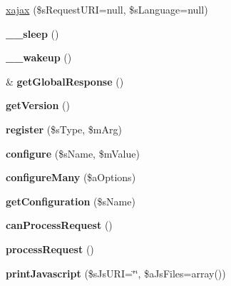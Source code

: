 \begin{DoxyCompactItemize}
\item 
\hyperlink{classxajax_adbddae8f02c1f248d6650dee56503ea3}{xajax} (\$sRequestURI=null, \$sLanguage=null)
\item 
\hypertarget{classxajax_a5f558295844bdfce0e5f1cc6aeddbf36}{
{\bfseries \_\-\_\-sleep} ()}
\label{classxajax_a5f558295844bdfce0e5f1cc6aeddbf36}

\item 
\hypertarget{classxajax_a30fd0f96255196bb018649011859f9e4}{
{\bfseries \_\-\_\-wakeup} ()}
\label{classxajax_a30fd0f96255196bb018649011859f9e4}

\item 
\hypertarget{classxajax_ab66d9aa22adc834870a7364e1b3cfabe}{
\& {\bfseries getGlobalResponse} ()}
\label{classxajax_ab66d9aa22adc834870a7364e1b3cfabe}

\item 
\hypertarget{classxajax_aa19cad4cb09886a518bae628de3ca707}{
{\bfseries getVersion} ()}
\label{classxajax_aa19cad4cb09886a518bae628de3ca707}

\item 
\hypertarget{classxajax_af63bdba3338c33a8811a74a968c788bc}{
{\bfseries register} (\$sType, \$mArg)}
\label{classxajax_af63bdba3338c33a8811a74a968c788bc}

\item 
\hypertarget{classxajax_aaac9a89700c41ca194a6036a7db20120}{
{\bfseries configure} (\$sName, \$mValue)}
\label{classxajax_aaac9a89700c41ca194a6036a7db20120}

\item 
\hypertarget{classxajax_a7cda7cef77d0048c33cdebf3b0eee539}{
{\bfseries configureMany} (\$aOptions)}
\label{classxajax_a7cda7cef77d0048c33cdebf3b0eee539}

\item 
\hypertarget{classxajax_a9d23ac65053c6df2bc2f876b3ab4080f}{
{\bfseries getConfiguration} (\$sName)}
\label{classxajax_a9d23ac65053c6df2bc2f876b3ab4080f}

\item 
\hypertarget{classxajax_a2c3062c6f948e2bc1b317740b2298405}{
{\bfseries canProcessRequest} ()}
\label{classxajax_a2c3062c6f948e2bc1b317740b2298405}

\item 
\hypertarget{classxajax_ad4a4b17aa4bfff5ea5f561568fdc0b99}{
{\bfseries processRequest} ()}
\label{classxajax_ad4a4b17aa4bfff5ea5f561568fdc0b99}

\item 
\hypertarget{classxajax_aa262ebfe81a75c38f15a687a6adb9ebb}{
{\bfseries printJavascript} (\$sJsURI=\char`\"{}\char`\"{}, \$aJsFiles=array())}
\label{classxajax_aa262ebfe81a75c38f15a687a6adb9ebb}


\end{DoxyCompactItemize}
